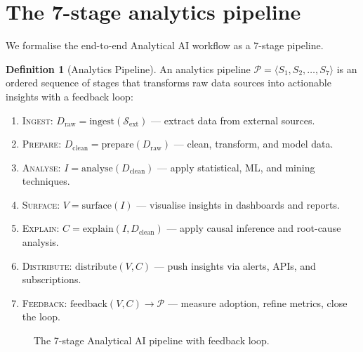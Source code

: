 \documentclass[preprint,12pt,authoryear]{elsarticle}
\theoremstyle{definition}
\newtheorem{definition}{Definition}
\begin{document}
\section{The 7-stage analytics pipeline}\label{sec:pipeline}

We formalise the end-to-end Analytical AI workflow as a 7-stage pipeline.

\begin{definition}[Analytics Pipeline]
An analytics pipeline $\mathcal{P} = \langle S_1, S_2, \ldots, S_7 \rangle$ is an ordered sequence of stages that transforms raw data sources into actionable insights with a feedback loop:
\begin{enumerate}
    \item \textsc{Ingest}: $D_{\text{raw}} = \text{ingest}(\mathcal{S}_{\text{ext}})$ --- extract data from external sources.
    \item \textsc{Prepare}: $D_{\text{clean}} = \text{prepare}(D_{\text{raw}})$ --- clean, transform, and model data.
    \item \textsc{Analyse}: $I = \text{analyse}(D_{\text{clean}})$ --- apply statistical, ML, and mining techniques.
    \item \textsc{Surface}: $V = \text{surface}(I)$ --- visualise insights in dashboards and reports.
    \item \textsc{Explain}: $C = \text{explain}(I, D_{\text{clean}})$ --- apply causal inference and root-cause analysis.
    \item \textsc{Distribute}: $\text{distribute}(V, C)$ --- push insights via alerts, APIs, and subscriptions.
    \item \textsc{Feedback}: $\text{feedback}(V, C) \rightarrow \mathcal{P}$ --- measure adoption, refine metrics, close the loop.
\end{enumerate}
\end{definition}

\begin{figure}[ht]
\centering
{}
\caption{The 7-stage Analytical AI pipeline with feedback loop.}
\label{fig:pipeline}
\end{figure}
\end{document}
